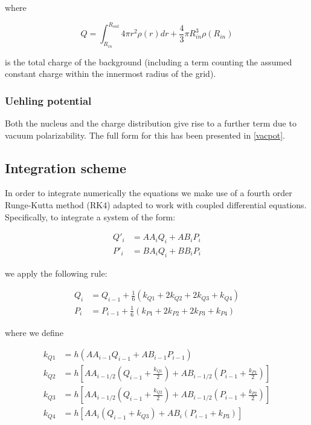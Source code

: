 \documentclass[]{report}
\begin{document}
where 

\begin{equation}
Q = \int_{R_{in}}^{R_{out}} 4\pi r^2\rho(r) dr + \frac{4}{3}\pi R_{in}^3\rho(R_{in})
\end{equation}

is the total charge of the background (including a term counting the assumed constant charge within the innermost radius of the grid).

\subsubsection{Uehling potential}

Both the nucleus and the charge distribution give rise to a further term due to vacuum polarizability. The full form for this has been presented in \ref{vacpot}.

\subsection{Integration scheme}

In order to integrate numerically the equations we make use of a fourth order Runge-Kutta method (RK4) \cite{press1992} adapted to work with coupled differential equations. Specifically, to integrate a system of the form:

\begin{align}\label{rk_qp}
Q'_i &= AA_i Q_i + AB_iP_i \\
P'_i &= BA_i Q_i + BB_iP_i
\end{align}

we apply the following rule:

\begin{align}
Q_i &= Q_{i-1} + \frac{1}{6}\left(k_{Q1}+2k_{Q2}+2k_{Q3}+k_{Q4}\right) \\
P_i &= P_{i-1} + \frac{1}{6}\left(k_{P1}+2k_{P2}+2k_{P3}+k_{P4}\right)
\end{align}

where we define

\begin{align}
k_{Q1} &= h\left(AA_{i-1}Q_{i-1}+AB_{i-1}P_{i-1}\right) \\
k_{Q2} &= h\left[AA_{i-1/2}\left(Q_{i-1}+\frac{k_{Q1}}{2}\right)+
AB_{i-1/2}\left(P_{i-1}+\frac{k_{P1}}{2}\right)\right] \\
k_{Q3} &= h\left[AA_{i-1/2}\left(Q_{i-1}+\frac{k_{Q2}}{2}\right)+
AB_{i-1/2}\left(P_{i-1}+\frac{k_{P2}}{2}\right)\right] \\
k_{Q4} &= h\left[AA_{i}(Q_{i-1}+k_{Q3})+AB_{i}(P_{i-1}+k_{P3})\right] \\
\end{align}
\end{document}
